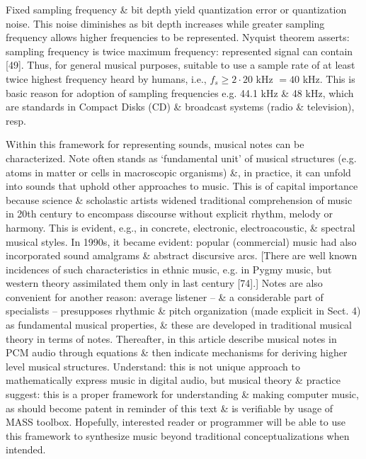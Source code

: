 \documentclass{article}
\begin{document}
\begin{itemize}
	Fixed sampling frequency \& bit depth yield quantization error or quantization noise. This noise diminishes as bit depth increases while greater sampling frequency allows higher frequencies to be represented. Nyquist theorem asserts: sampling frequency is twice maximum frequency: represented signal can contain [49]. Thus, for general musical purposes, suitable to use a sample rate of at least twice highest frequency heard by humans, i.e., $f_s\ge2\cdot20$ kHz $= 40$ kHz. This is basic reason for adoption of sampling frequencies e.g. 44.1 kHz \& 48 kHz, which are standards in Compact Disks (CD) \& broadcast systems (radio \& television), resp.
	
	Within this framework for representing sounds, musical notes can be characterized. Note often stands as `fundamental unit' of musical structures (e.g. atoms in matter or cells in macroscopic organisms) \&, in practice, it can unfold into sounds that uphold other approaches to music. This is of capital importance because science \& scholastic artists widened traditional comprehension of music in 20th century to encompass discourse without explicit rhythm, melody or harmony. This is evident, e.g., in concrete, electronic, electroacoustic, \& spectral musical styles. In 1990s, it became evident: popular (commercial) music had also incorporated sound amalgrams \& abstract discursive arcs. [There are well known incidences of such characteristics in ethnic music, e.g. in Pygmy music, but western theory assimilated them only in last century [74].] Notes are also convenient for another reason: average listener -- \& a considerable part of specialists -- presupposes rhythmic \& pitch organization (made explicit in Sect. 4) as fundamental musical properties, \& these are developed in traditional musical theory in terms of notes. Thereafter, in this article describe musical notes in PCM audio through equations \& then indicate mechanisms for deriving higher level musical structures. Understand: this is not unique approach to mathematically express music in digital audio, but musical theory \& practice suggest: this is a proper framework for understanding \& making computer music, as should become patent in reminder of this text \& is verifiable by usage of MASS toolbox. Hopefully, interested reader or programmer will be able to use this framework to synthesize music beyond traditional conceptualizations when intended.
	

\end{itemize}
\end{document}
